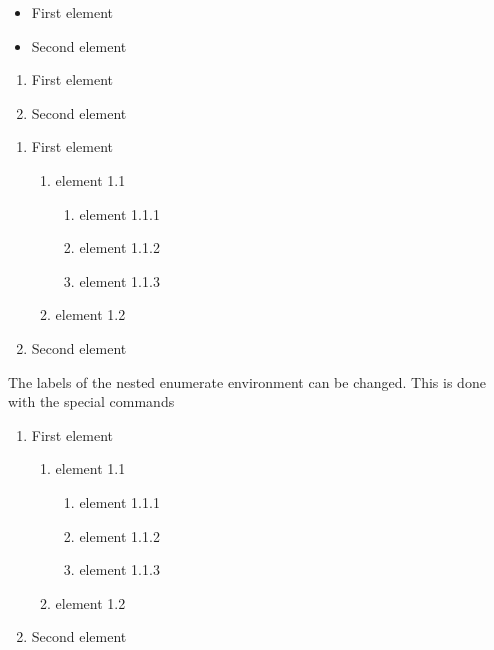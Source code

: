\documentclass[a4paper]{article}
\begin{document}
\begin{itemize}
  \item First element
  \item Second element
\end{itemize}

\begin{enumerate}
  \item First element
  \item Second element
\end{enumerate}

\begin{enumerate}
  \item First element
    \begin{enumerate}
      \item element 1.1
      \begin{enumerate}
        \item element 1.1.1
        \item element 1.1.2
        \item element 1.1.3
      \end{enumerate}
      \item element 1.2
    \end{enumerate}
  \item Second element
\end{enumerate}

The labels of the nested enumerate environment can be changed. This is done with the special commands 

\theenumii 

\theenumiii

\renewcommand\theenumii{}

\theenumii

\begin{enumerate}
  \item First element
    \begin{enumerate}
      \item element 1.1
      \begin{enumerate}
        \item element 1.1.1
        \item element 1.1.2
        \item element 1.1.3
      \end{enumerate}
      \item element 1.2
    \end{enumerate}
  \item Second element
\end{enumerate}
\end{document}
